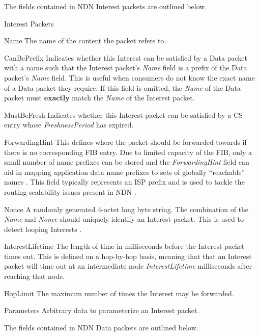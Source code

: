 The fields contained in NDN Interest packets are outlined below.
\begin{labeling}{Interest Packets}
    \item [Name] The name of the content the packet refers to.
    \item [CanBePrefix] Indicates whether this Interest can be satisfied by a Data packet with a name such that the Interest packet's \textit{Name} field is a prefix of the Data packet's \textit{Name} field. This is useful when consumers do not know the exact name of a Data packet they require. If this field is omitted, the \textit{Name} of the Data packet must \textbf{exactly} match the \textit{Name} of the Interest packet. 
    \item [MustBeFresh] Indicates whether this Interest packet can be satisfied by a CS entry whose \textit{FreshnessPeriod} has expired.
    \item [ForwardingHint] This defines where the packet should be forwarded towards if there is no corresponding FIB entry. Due to limited capacity of the FIB, only a small number of name prefixes can be stored and the \textit{ForwardingHint} field can aid in mapping application data name prefixes to sets of globally “reachable” names \cite{ndn-dns}. This field typically represents an ISP prefix and is used to tackle the routing scalability issues present in NDN \cite{ndn-forwarding-hint}.
    \item [Nonce] A randomly generated 4-octet long byte string. The combination of the \textit{Name} and \textit{Nonce} should uniquely identify an Interest packet. This is used to detect looping Interests \cite{ndn-packet-spec}.
    \item [InterestLifetime] The length of time in milliseconds before the Interest packet times out. This is defined on a hop-by-hop basis, meaning that that an Interest packet will time out at an intermediate node \textit{InterestLifetime} milliseconds after reaching that node.
    \item [HopLimit] The maximum number of times the Interest may be forwarded.
    \item [Parameters] Arbitrary data to parameterize an Interest packet.
\end{labeling}

\vspace{5mm}
The fields contained in NDN Data packets are outlined below.

